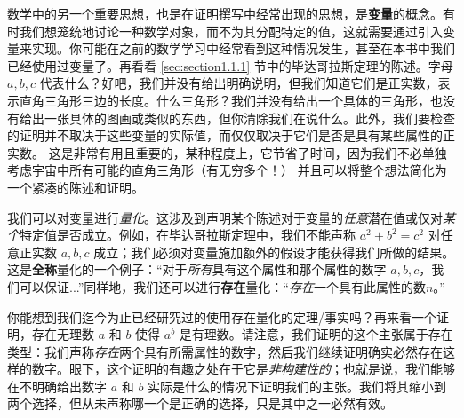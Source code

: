 数学中的另一个重要思想，也是在证明撰写中经常出现的思想，是\textbf{变量}的概念。有时我们想笼统地讨论一种数学对象，而不为其分配特定的值，这就需要通过引入变量来实现。你可能在之前的数学学习中经常看到这种情况发生，甚至在本书中我们已经使用过变量了。再看看 \ref{sec:section1.1.1} 节中的毕达哥拉斯定理的陈述。字母 $a,b,c$ 代表什么？好吧，我们并没有给出明确说明，但我们知道它们是正实数，表示直角三角形三边的长度。什么三角形？我们并没有给出一个具体的三角形，也没有给出一张具体的图画或类似的东西，但你清除我们在说什么。此外，我们要检查的证明并不取决于这些变量的实际值，而仅仅取决于它们是否是具有某些属性的正实数。 这是非常有用且重要的，某种程度上，它节省了时间，因为我们不必单独考虑宇宙中所有可能的直角三角形（有无穷多个！） 并且可以将整个想法简化为一个紧凑的陈述和证明。

我们可以对变量进行\emph{量化}。这涉及到声明某个陈述对于变量的\emph{任意}潜在值或仅对\emph{某个}特定值是否成立。例如，在毕达哥拉斯定理中，我们不能声称 $a^2+b^2=c^2$ 对任意正实数 $a,b,c$ 成立；我们必须对变量施加额外的假设才能获得我们所做的结果。这是\textbf{全称}量化的一个例子：``对于\emph{所有}具有这个属性和那个属性的数字 $a,b,c$，我们可以保证...''同样地，我们还可以进行\textbf{存在}量化：``\emph{存在}一个具有此属性的数$n$。''

你能想到我们迄今为止已经研究过的使用存在量化的定理/事实吗？再来看一个证明，存在无理数 $a$ 和 $b$ 使得 $a^b$ 是有理数。请注意，我们证明的这个主张属于存在类型：我们声称\emph{存在}两个具有所需属性的数字，然后我们继续证明确实必然存在这样的数字。眼下，这个证明的有趣之处在于它是\emph{非构建性的}；也就是说，我们能够在不明确给出数字 $a$ 和 $b$ 实际是什么的情况下证明我们的主张。我们将其缩小到两个选择，但从未声称哪一个是正确的选择，只是其中之一必然有效。
